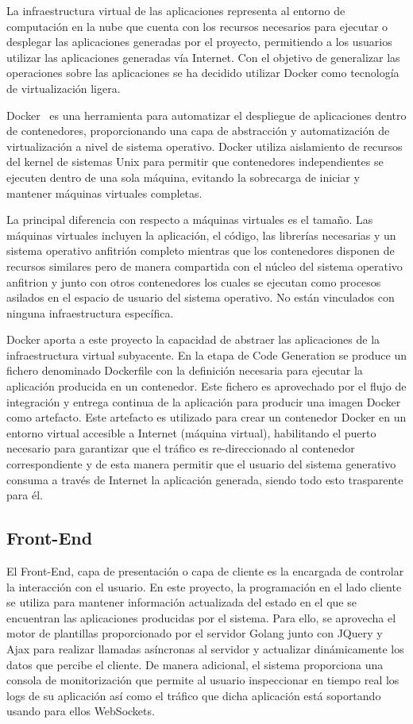 \documentclass[a4paper,11pt]{book}
\begin{document}
La infraestructura virtual de las aplicaciones  representa al entorno de computación en la nube que cuenta con los recursos necesarios para ejecutar o desplegar las aplicaciones generadas por el proyecto, permitiendo a los usuarios utilizar las aplicaciones generadas vía Internet.
Con el objetivo de generalizar las operaciones sobre las aplicaciones  se ha decidido utilizar Docker como tecnología de virtualización ligera.

Docker~\cite{dk} es una herramienta para automatizar el despliegue de aplicaciones dentro de contenedores, proporcionando una capa de abstracción y automatización de virtualización a nivel de sistema operativo. Docker utiliza aislamiento de recursos del kernel de sistemas Unix  para permitir que contenedores independientes se ejecuten dentro de una sola máquina, evitando la sobrecarga de iniciar y mantener máquinas virtuales completas.

La principal diferencia con respecto a máquinas virtuales es el tamaño. Las máquinas virtuales incluyen la aplicación, el código, las librerías necesarias y un sistema operativo anfitrión completo mientras que los contenedores disponen de recursos similares pero de manera compartida con el núcleo  del sistema operativo anfitrion y junto con otros contenedores los cuales se ejecutan  como procesos asilados en el espacio de usuario del sistema operativo. No están vinculados con ninguna infraestructura específica.

Docker aporta a este proyecto la capacidad de abstraer las aplicaciones de la infraestructura virtual subyacente. En la etapa de Code Generation se produce un fichero denominado Dockerfile con la definición necesaria para ejecutar la aplicación producida en un contenedor. Este fichero es aprovechado  por el flujo de integración y entrega continua de la aplicación  para producir una imagen Docker como artefacto. Este artefacto es utilizado para crear un contenedor Docker en un entorno virtual accesible a Internet (máquina virtual), habilitando el puerto necesario para garantizar que el tráfico es re-direccionado al contenedor correspondiente y de esta manera permitir que el usuario del sistema generativo consuma a través de Internet la aplicación generada, siendo todo esto trasparente para él. 


\subsection{Front-End}

El Front-End, capa de presentación o capa de cliente es la encargada de controlar la interacción con el usuario. En este proyecto, la programación en el lado cliente se utiliza para mantener  información actualizada del estado en el que se encuentran las aplicaciones producidas por el sistema. Para ello, se aprovecha el motor de plantillas proporcionado por el servidor Golang junto con JQuery y Ajax para realizar llamadas asíncronas al servidor y actualizar dinámicamente los datos que percibe el cliente. De manera adicional, el sistema proporciona una consola de monitorización  que permite al usuario inspeccionar en tiempo real los logs de su aplicación así como el tráfico que dicha aplicación está soportando usando para ellos WebSockets. 
\end{document}
